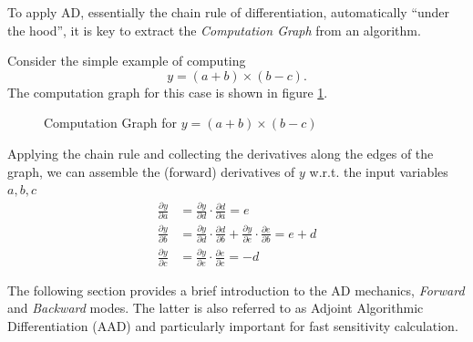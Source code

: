 To apply AD, essentially the chain rule of differentiation, automatically ``under
the hood'', it is key to extract the {\em Computation Graph} from an algorithm.

Consider the simple example of computing
$$
y = (a + b) \times (b - c).
$$
The computation graph for this case is shown in figure \ref{fig:cg}.

\begin{center}
  \begin{figure}[hbt]
    \caption{Computation Graph for $y = (a + b) \times (b - c)$}
    \label{fig:cg}
  \end{figure}
\end{center}

Applying the chain rule and collecting the derivatives along the edges of the graph, we can assemble
the (forward) derivatives of $y$ w.r.t. the input variables $a, b, c$
\begin{align*}
  \frac{\partial y}{\partial a} &= \frac{\partial y}{\partial d} \cdot \frac{\partial d}{\partial a} = e\\
  \frac{\partial y}{\partial b} &= \frac{\partial y}{\partial d} \cdot \frac{\partial d}{\partial b} +  \frac{\partial y}{\partial e} \cdot \frac{\partial e}{\partial b} = e + d \\
  \frac{\partial y}{\partial c} &= \frac{\partial y}{\partial e} \cdot \frac{\partial e}{\partial c} = -d
  \end{align*}

The following section provides a brief introduction to the AD mechanics, {\em Forward} and {\em Backward} modes. The latter is also referred to as Adjoint Algorithmic Differentiation (AAD) and particularly important for fast sensitivity calculation.

